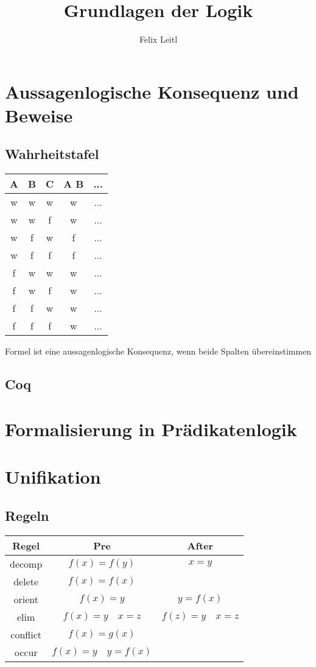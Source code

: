 \documentclass{article}
\title{Grundlagen der Logik}
\author{Felix Leitl}
\begin{document}
	\maketitle
	\newpage
	\section{Aussagenlogische Konsequenz und Beweise}
		\subsection{Wahrheitstafel}
			\begin{center}
				\begin{tabular}{c|c|c|c|c}
					A & B & C & A \to B & ...\\
					\hline
					w & w & w & w & ...\\
					\hline
					w & w & f & w & ...\\
					\hline
					w & f & w & f & ...\\
					\hline
					w & f & f & f & ...\\
					\hline
					f & w & w & w & ...\\ 
					\hline
					f & w & f & w & ...\\
					\hline
					f & f & w & w & ...\\
					\hline
					f & f & f & w & ...
				\end{tabular}
			\end{center}
		Formel ist eine aussagenlogische Konsequenz, wenn beide Spalten übereinstimmen
		\subsection{Coq}
	\section{Formalisierung in Prädikatenlogik}
	\section{Unifikation}
		\subsection{Regeln} %
			\begin{center}
				\begin{tabular} {c|c|c}
					Regel & Pre & After \\
					\hline
					decomp & $f(x)=f(y)$ & $x=y$ \\
					\hline
					delete & $f(x) = f(x)$ & \\
					\hline
					orient & $f(x) = y$ & $y = f(x)$ \\
					\hline
					elim & $f(x) = y \quad x = z$ & $f(z)= y \quad x = z$ \\
					\hline
					conflict & $f(x) = g(x)$ & \bot \\
					\hline
					occur & $f(x) = y \quad y = f(x)$ & \bot
				\end{tabular}
			\end{center}
\end{document}
